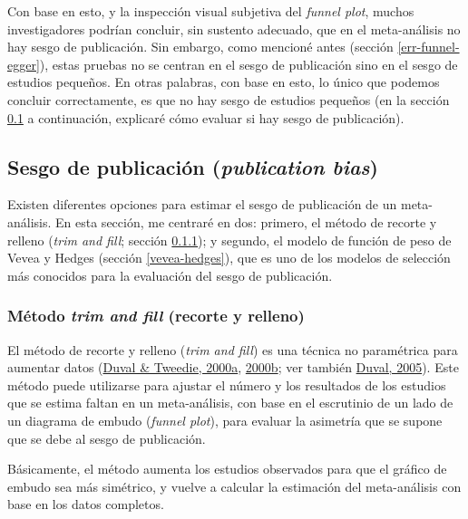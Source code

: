 \documentclass[
  bookmarksnumbered]{article}
\begin{document}
Con base en esto, y la inspección visual subjetiva del \emph{funnel plot}, muchos investigadores podrían concluir, sin sustento adecuado, que en el meta-análisis no hay sesgo de publicación. Sin embargo, como mencioné antes (sección \ref{err-funnel-egger}), estas pruebas no se centran en el sesgo de publicación sino en el sesgo de estudios pequeños. En otras palabras, con base en esto, lo único que podemos concluir correctamente, es que no hay sesgo de estudios pequeños (en la sección \ref{sesgo-pub} a continuación, explicaré cómo evaluar si hay sesgo de publicación).

\hypertarget{sesgo-pub}{%
\subsection{\texorpdfstring{Sesgo de publicación (\emph{publication bias})}{Sesgo de publicación (publication bias)}}\label{sesgo-pub}}

Existen diferentes opciones para estimar el sesgo de publicación de un meta-análisis. En esta sección, me centraré en dos: primero, el método de recorte y relleno (\emph{trim and fill}; sección \ref{trim-fill}); y segundo, el modelo de función de peso de Vevea y Hedges (sección \ref{vevea-hedges}), que es uno de los modelos de selección más conocidos para la evaluación del sesgo de publicación.

\hypertarget{trim-fill}{%
\subsubsection{\texorpdfstring{Método \emph{trim and fill} (recorte y relleno)}{Método trim and fill (recorte y relleno)}}\label{trim-fill}}

El método de recorte y relleno (\emph{trim and fill}) es una técnica no paramétrica para aumentar datos (\protect\hyperlink{ref-duvalNonparametricTrimFill2000}{Duval \& Tweedie, 2000a}, \protect\hyperlink{ref-duvalTrimFillSimple2000}{2000b}; ver también \protect\hyperlink{ref-duvalTrimFillMethod2005}{Duval, 2005}). Este método puede utilizarse para ajustar el número y los resultados de los estudios que se estima faltan en un meta-análisis, con base en el escrutinio de un lado de un diagrama de embudo (\emph{funnel plot}), para evaluar la asimetría que se supone que se debe al sesgo de publicación.

Básicamente, el método aumenta los estudios observados para que el gráfico de embudo sea más simétrico, y vuelve a calcular la estimación del meta-análisis con base en los datos completos.
\end{document}
